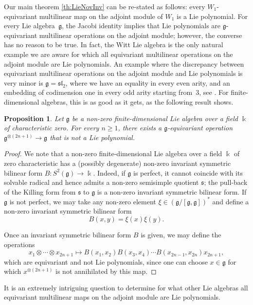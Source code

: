 \documentclass[11pt,reqno]{amsart}
\theoremstyle{plain}
\newtheorem{proposition}[theorem]{Proposition}
\theoremstyle{definition}
\theoremstyle{remark}
\newcommand{\bk}{\Bbbk}
\begin{document}
Our main theorem \ref{th:LieNovInv} can be re-stated as follows: every $W_1$-equivariant multilinear map on the adjoint module of $W_1$ is a Lie polynomial. For every Lie algebra~$\mathfrak{g}$, the Jacobi identity implies that Lie polynomials are $\mathfrak{g}$-equivariant multilinear operations on the adjoint module; however, the converse has no reason to be true. In fact, the Witt Lie algebra is the only natural example we are aware for which all equivariant multilinear operations on the adjoint module are Lie polynomials. An example where the discrepancy between equivariant multilinear operations on the adjoint module and Lie polynomials is very minor is $\mathfrak{g}=\mathfrak{sl}_2$, where we have an equality in every even arity, and an embedding of codimension one in every odd arity starting from~$3$, see \cite{MR5093214,MR3556704}. For finite-dimensional algebras, this is as good as it gets, as the following result shows.

\begin{proposition}
Let $\mathfrak{g}$ be a non-zero finite-dimensional Lie algebra over a field $\bk$ of characteristic zero. For every $n\ge 1$, there exists a $\mathfrak{g}$-equivariant operation $\mathfrak{g}^{\otimes (2n+1)}\to \mathfrak{g}$ that is not a Lie polynomial. 
\end{proposition}

\begin{proof}
We note that a non-zero finite-dimensional Lie algebra over a field $\bk$ of zero characteristic has a (possibly degenerate) non-zero invariant symmetric bilinear form $B\colon S^2(\mathfrak{g})\to\bk$. Indeed, if $\mathfrak{g}$ is perfect, it cannot coincide with its solvable radical and hence admits a non-zero semisimple quotient $\mathfrak{s}$; the pull-back of the Killing form from $\mathfrak{s}$ to $\mathfrak{g}$ is a non-zero invariant symmetric bilinear form. If $\mathfrak{g}$ is not perfect, we may take any non-zero element $\xi\in (\mathfrak{g}/[\mathfrak{g},\mathfrak{g}])^*$ and define a non-zero invariant symmetric bilinear form 
  \[
 B(x,y)=\xi(x)\xi(y).   
  \]

Once an invariant symmetric bilinear form $B$ is given, we may define the operations
 \[
x_1\otimes \cdots \otimes x_{2n+1}\mapsto B(x_1,x_2)B(x_3,x_4)\cdots B(x_{2n-1},x_{2n})x_{2n+1},      
 \]
which are equivariant and not Lie polynomials, since one can choose $x\in\mathfrak{g}$ for which $x^{\otimes(2n+1)}$ is not annihilated by this map. 
\end{proof}

It is an extremely intriguing question to determine for what other Lie algebras all equivariant multilinear maps on the adjoint module are Lie polynomials.


\printbibliography
\end{document}
